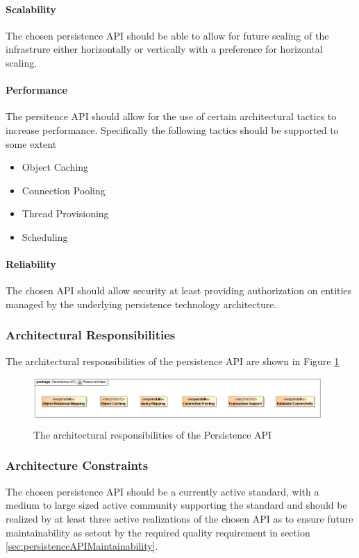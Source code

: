 \paragraph{Scalability}
The chosen persistence API should be able to allow for future scaling of the
infrastrure either horizontally or vertically with a preference for
horizontal scaling.

\paragraph{Performance}
The persitence API should allow for the use of certain architectural tactics
to increase performance. Specifically the following tactics should be supported
to some extent
\begin{itemize}
	\item Object Caching
	\item Connection Pooling
	\item Thread Provisioning
	\item Scheduling
\end{itemize}

\paragraph{Reliability}
The chosen API should allow security at least providing authorization on
entities managed by the underlying persistence technology architecture.

\subsubsection{Architectural Responsibilities}
The architectural responsibilities of the persistence API are shown in
Figure \ref{fig:persistenceResponsibilities}
\begin{figure}[H]
	\begin{center}
	\includegraphics[scale=0.5]{../Diagrams and Charts/Persistence API/Responsibilities.jpg}
	\caption{The architectural responsibilities of the Persistence API}
	\label{fig:persistenceResponsibilities}
	\end{center}
\end{figure}

\subsubsection{Architecture Constraints}
The chosen persistence API should be a currently active standard, with a medium
to large sized active community supporting the standard and should be realized
by at least three active realizations of the chosen API as to ensure future
maintainability as setout by the required quality requirement in
section \ref{sec:persistenceAPIMaintainability}.
\label{sec:persistenceAPIArchitecturalConstraints}

